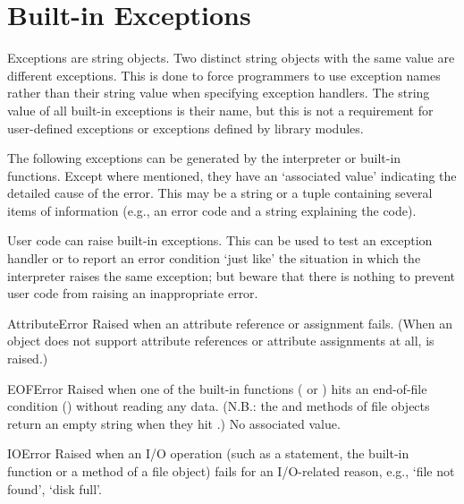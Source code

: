 \section{Built-in Exceptions}

Exceptions are string objects.  Two distinct string objects with the
same value are different exceptions.  This is done to force programmers
to use exception names rather than their string value when specifying
exception handlers.  The string value of all built-in exceptions is
their name, but this is not a requirement for user-defined exceptions
or exceptions defined by library modules.

The following exceptions can be generated by the interpreter or
built-in functions.  Except where mentioned, they have an `associated
value' indicating the detailed cause of the error.  This may be a
string or a tuple containing several items of information (e.g., an
error code and a string explaining the code).

User code can raise built-in exceptions.  This can be used to test an
exception handler or to report an error condition `just like' the
situation in which the interpreter raises the same exception; but
beware that there is nothing to prevent user code from raising an
inappropriate error.

\renewcommand{\indexsubitem}{(built-in exception)}

\begin{excdesc}{AttributeError}
  Raised when an attribute reference or assignment fails.  (When an
  object does not support attribute references or attribute assignments
  at all,  is raised.)
\end{excdesc}

\begin{excdesc}{EOFError}
  Raised when one of the built-in functions ( or
  ) hits an end-of-file condition (\EOF{}) without
  reading any data.
  (N.B.: the  and  methods of file
  objects return an empty string when they hit \EOF{}.)  No associated value.
\end{excdesc}

\begin{excdesc}{IOError}
  Raised when an I/O operation (such as a  statement, the
  built-in  function or a method of a file object) fails
  for an I/O-related reason, e.g., `file not found', `disk full'.
\end{excdesc}

